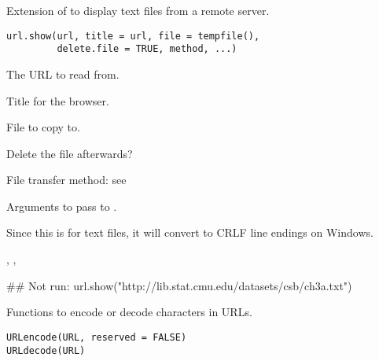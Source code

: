 %
\begin{Description}\relax
Extension of  to display text files from a remote 
server.
\end{Description}
%
\begin{Usage}
\begin{verbatim}
url.show(url, title = url, file = tempfile(),
         delete.file = TRUE, method, ...)
\end{verbatim}
\end{Usage}
%
\begin{Arguments}
\begin{ldescription}
\item[\code{url}] The URL to read from.
\item[\code{title}] Title for the browser.
\item[\code{file}] File to copy to.
\item[\code{delete.file}] Delete the file afterwards?
\item[\code{method}] File transfer method: see 
\item[\code{...}] Arguments to pass to .
\end{ldescription}
\end{Arguments}
%
\begin{Note}\relax
Since this is for text files, it will convert to CRLF line endings on
Windows.
\end{Note}
%
\begin{SeeAlso}\relax
{}, , 
\end{SeeAlso}
%
\begin{Examples}
\begin{ExampleCode}
## Not run: url.show("http://lib.stat.cmu.edu/datasets/csb/ch3a.txt")
\end{ExampleCode}
\end{Examples}
%
\begin{Description}\relax
Functions to encode or decode characters in URLs.
\end{Description}
%
\begin{Usage}
\begin{verbatim}
URLencode(URL, reserved = FALSE)
URLdecode(URL)
\end{verbatim}
\end{Usage}
